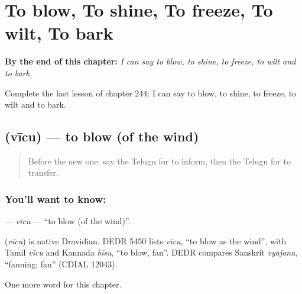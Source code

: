 
\chapter{To blow, To shine, To freeze, To wilt, To bark}
\label{ch:te-to-blow-to-shine-to-freeze-to-wilt-to-bark}

\begin{chapteropening}
\textbf{By the end of this chapter:} \emph{I can say to blow, to shine, to freeze, to wilt and to bark.}

Complete the last lesson of chapter 244: I can say to blow, to shine, to freeze, to wilt and to bark.
\end{chapteropening}

\section[\texorpdfstring{\te{వీచు} (vīcu)}{వీచు (vīcu)}]{ (vīcu) — to blow (of the wind)}

\label{lesson:TE-C244-vicu}



\begin{quote}
Before the new one: say the Telugu for to inform, then the Telugu for to transfer.
\end{quote}

\subsection*{You'll want to know: }
\textbf{} — \emph{vīcu} — \textquotedblleft{}to blow (of the wind)\textquotedblright{}.

\begin{cousinweb}
\textbf{} (\emph{vīcu}) is native Dravidian. DEDR 5450 lists \emph{vīcu}, \textquotedblleft{}to blow as the wind\textquotedblright{}, with Tamil \emph{vīcu} and Kannada \emph{bīsu}, \textquotedblleft{}to blow, fan\textquotedblright{}. DEDR compares Sanskrit \emph{vyajana}, \textquotedblleft{}fanning; fan\textquotedblright{} (CDIAL 12043).
\end{cousinweb}

\begin{grammarlens}[title={What you've built}]
One more word for this chapter.
\end{grammarlens}

